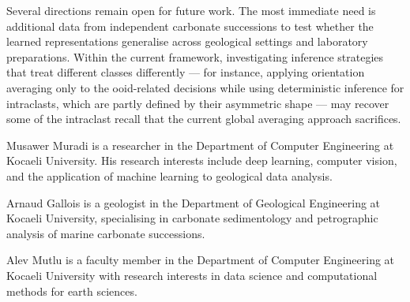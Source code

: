 \documentclass[a4paper,fleqn]{cas-dc}
\begin{document}
Several directions remain open for future work. The most immediate need is additional data from independent carbonate successions to test whether the learned representations generalise across geological settings and laboratory preparations. Within the current framework, investigating inference strategies that treat different classes differently --- for instance, applying orientation averaging only to the ooid-related decisions while using deterministic inference for intraclasts, which are partly defined by their asymmetric shape --- may recover some of the intraclast recall that the current global averaging approach sacrifices.

\printcredits




\bio{}
Musawer Muradi is a researcher in the Department of Computer Engineering at Kocaeli University. His research interests include deep learning, computer vision, and the application of machine learning to geological data analysis.
\endbio

\bio{}
Arnaud Gallois is a geologist in the Department of Geological Engineering at Kocaeli University, specialising in carbonate sedimentology and petrographic analysis of marine carbonate successions.
\endbio

\bio{}
Alev Mutlu is a faculty member in the Department of Computer Engineering at Kocaeli University with research interests in data science and computational methods for earth sciences.
\endbio
\end{document}
